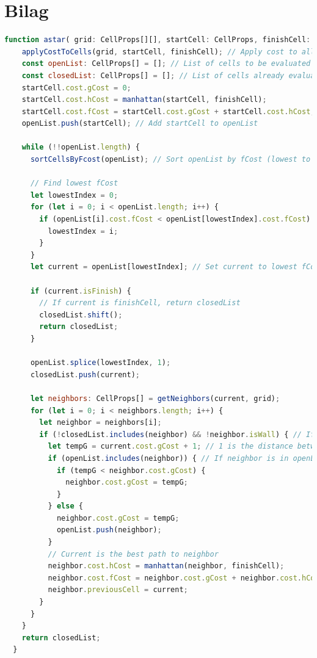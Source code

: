 \documentclass[12pt]{article}
\begin{document}
\section*{Bilag}
\begin{lstlisting}[language=JavaScript, caption=Udvalgt kode af A* algoritmen, label={lst:A*}]
  function astar( grid: CellProps[][], startCell: CellProps, finishCell: CellProps) {
    applyCostToCells(grid, startCell, finishCell); // Apply cost to all cells
    const openList: CellProps[] = []; // List of cells to be evaluated
    const closedList: CellProps[] = []; // List of cells already evaluated
    startCell.cost.gCost = 0;
    startCell.cost.hCost = manhattan(startCell, finishCell);
    startCell.cost.fCost = startCell.cost.gCost + startCell.cost.hCost;
    openList.push(startCell); // Add startCell to openList
  
    while (!!openList.length) {
      sortCellsByFcost(openList); // Sort openList by fCost (lowest to highest)
  
      // Find lowest fCost 
      let lowestIndex = 0;
      for (let i = 0; i < openList.length; i++) {
        if (openList[i].cost.fCost < openList[lowestIndex].cost.fCost) {
          lowestIndex = i;
        }
      }
      let current = openList[lowestIndex]; // Set current to lowest fCost
    
      if (current.isFinish) {
        // If current is finishCell, return closedList
        closedList.shift();
        return closedList;
      }
  
      openList.splice(lowestIndex, 1);
      closedList.push(current);
  
      let neighbors: CellProps[] = getNeighbors(current, grid);
      for (let i = 0; i < neighbors.length; i++) {
        let neighbor = neighbors[i];
        if (!closedList.includes(neighbor) && !neighbor.isWall) { // If neighbor is not in closedList and is not a wall
          let tempG = current.cost.gCost + 1; // 1 is the distance between current and neighbor
          if (openList.includes(neighbor)) { // If neighbor is in openList
            if (tempG < neighbor.cost.gCost) {
              neighbor.cost.gCost = tempG;
            }
          } else {
            neighbor.cost.gCost = tempG;
            openList.push(neighbor);
          }
          // Current is the best path to neighbor 
          neighbor.cost.hCost = manhattan(neighbor, finishCell);
          neighbor.cost.fCost = neighbor.cost.gCost + neighbor.cost.hCost;
          neighbor.previousCell = current;
        }
      }
    }
    return closedList;
  }
\end{lstlisting}
\end{document}
